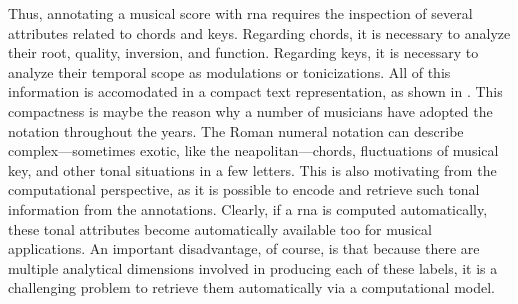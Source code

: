 Thus, annotating a musical score with \gls{rna} requires the
inspection of several attributes related to chords and keys.
Regarding chords, it is necessary to analyze their root,
quality, inversion, and function. Regarding keys, it is
necessary to analyze their temporal scope as modulations or
tonicizations. All of this information is accomodated in a
compact text representation, as shown in
. This compactness is maybe
the reason why a number of musicians have adopted the
notation throughout the years. The Roman numeral notation
can describe complex---sometimes exotic, like the
\gls{neapolitan}---chords, fluctuations of musical key, and
other tonal situations in a few letters. This is also
motivating from the computational perspective, as it is
possible to encode and retrieve such tonal information from
the annotations. Clearly, if a \gls{rna} is computed
automatically, these tonal attributes become automatically
available too for musical applications. An important
disadvantage, of course, is that because there are multiple
analytical dimensions involved in producing each of these
labels, it is a challenging problem to retrieve them
automatically via a computational model.






